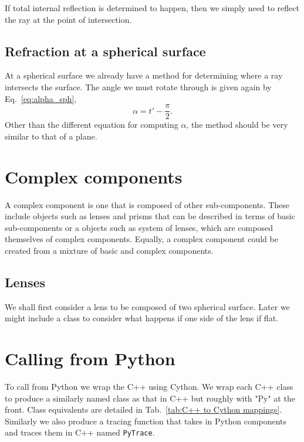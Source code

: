\documentclass{article}
\begin{document}
If total internal reflection is determined to happen, then we simply need to reflect the ray at the point of intersection.

\subsection{Refraction at a spherical surface}
At a spherical surface we already have a method for determining where a ray intersects the surface. The angle we must rotate through is given again by Eq.~\ref{eq:alpha_sph},
\begin{equation}
    \alpha = t' - \frac{\pi}{2}.
\end{equation}
Other than the different equation for computing $\alpha$, the method should be very similar to that of a plane.

\section{Complex components}
A complex component is one that is composed of other sub-components. These include objects such as lenses and prisms that can be described in terms of basic sub-components or a objects such as system of lenses, which are composed themselves of complex components. Equally, a complex component could be created from a mixture of basic and complex components.

\subsection{Lenses}
We shall first consider a lens to be composed of two spherical surface. Later we might include a class to consider what happens if one side of the lens if flat.


\section{Calling from Python}
To call from Python we wrap the C++ using Cython. We wrap each C++ class to produce a similarly named class as that in C++ but roughly with "Py" at the front. Class equivalents are detailed in Tab.~\ref{tab:C++ to Cython mappings}. Similarly we also produce a tracing function that takes in Python components and traces them in C++ named \texttt{PyTrace}.
\end{document}
